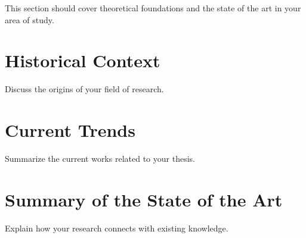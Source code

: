 
This section should cover theoretical foundations and the state of the art in your area of study.

\section{Historical Context}
Discuss the origins of your field of research.

\section{Current Trends}
Summarize the current works related to your thesis.

\section{Summary of the State of the Art}
Explain how your research connects with existing knowledge.
